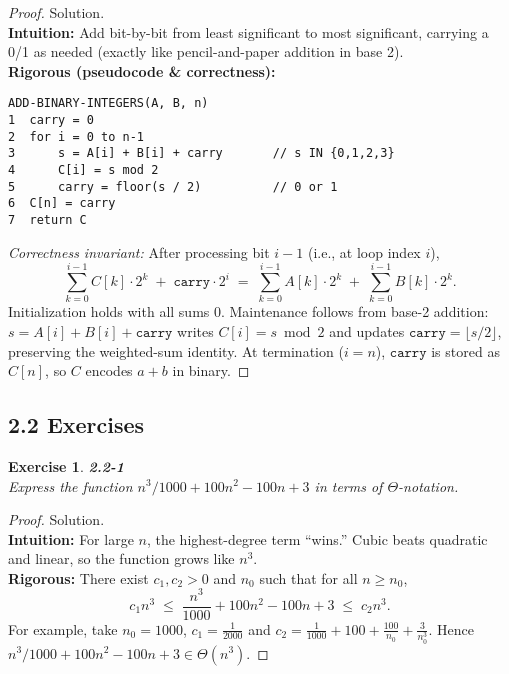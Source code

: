 \documentclass[12pt]{article}
\newtheorem{exercise}[theorem]{Exercise}
\theoremstyle{definition}
\begin{document}
\begin{proof}
Solution.\\

\noindent
\textbf{Intuition:} Add bit-by-bit from least significant to most significant, carrying
a 0/1 as needed (exactly like pencil-and-paper addition in base 2).\\

\noindent
\textbf{Rigorous (pseudocode \& correctness):}
\begin{verbatim}
ADD-BINARY-INTEGERS(A, B, n)
1  carry = 0
2  for i = 0 to n-1
3      s = A[i] + B[i] + carry       // s IN {0,1,2,3}
4      C[i] = s mod 2
5      carry = floor(s / 2)          // 0 or 1
6  C[n] = carry
7  return C
\end{verbatim}
\emph{Correctness invariant:} After processing bit $i-1$ (i.e., at loop index $i$),
\[
\sum_{k=0}^{i-1} C[k]\cdot 2^k \;+\; \texttt{carry}\cdot 2^i
\;=\; \sum_{k=0}^{i-1} A[k]\cdot 2^k \;+\; \sum_{k=0}^{i-1} B[k]\cdot 2^k.
\]
Initialization holds with all sums $0$. Maintenance follows from base-2 addition:
$s = A[i]+B[i]+\texttt{carry}$ writes $C[i]=s\bmod 2$ and updates $\texttt{carry}=\lfloor s/2\rfloor$,
preserving the weighted-sum identity. At termination ($i=n$), $\texttt{carry}$ is
stored as $C[n]$, so $C$ encodes $a+b$ in binary.
\end{proof}

\dotfill
\newpage

\subsection*{2.2 Exercises}


\begin{exercise}
\noindent
\textbf{2.2-1}\\
\noindent
Express the function $n^3/1000 + 100n^2 - 100n + 3$ in terms of $\Theta$-notation.
\end{exercise}

\vspace{1pt}

\begin{proof}
Solution.\\

\noindent
\textbf{Intuition:} For large $n$, the highest-degree term “wins.” Cubic beats quadratic and linear,
so the function grows like $n^3$.\\

\noindent
\textbf{Rigorous:} There exist $c_1,c_2>0$ and $n_0$ such that for all $n\ge n_0$,
\[
c_1 n^3 \;\le\; \frac{n^3}{1000} + 100n^2 - 100n + 3 \;\le\; c_2 n^3 .
\]
For example, take $n_0=1000$, $c_1=\tfrac{1}{2000}$ and $c_2=\tfrac{1}{1000}+100+\tfrac{100}{n_0}+\tfrac{3}{n_0^3}$.
Hence $n^3/1000 + 100n^2 - 100n + 3 \in \Theta(n^3)$.
\end{proof}
\end{document}
